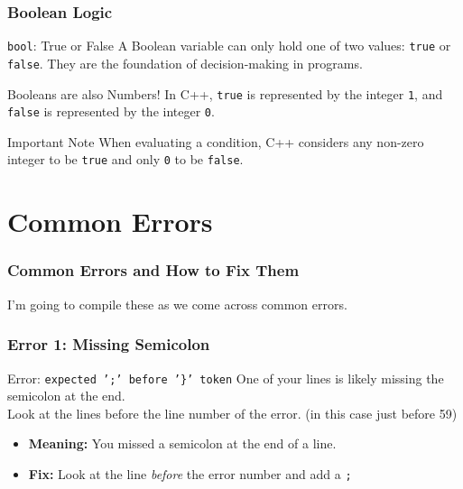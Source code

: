 \documentclass{beamer}
\begin{document}
\begin{frame}
\frametitle{Boolean Logic}
\begin{block}{\texttt{bool}: True or False}
A Boolean variable can only hold one of two values: \texttt{true} or \texttt{false}. They are the foundation of decision-making in programs.
\end{block}\pause

\begin{alertblock}{Booleans are also Numbers!}
In C++, \texttt{true} is represented by the integer \texttt{1}, and \texttt{false} is represented by the integer \texttt{0}.
\end{alertblock}\pause

\begin{exampleblock}{Important Note}
When evaluating a condition, C++ considers any non-zero integer to be \texttt{true} and only \texttt{0} to be \texttt{false}.
\end{exampleblock}
\end{frame}


\section{Common Errors}

\begin{frame}
\frametitle{Common Errors and How to Fix Them}
I'm going to compile these as we come across common errors.
\end{frame}

\begin{frame}
\frametitle{Error 1: Missing Semicolon}
\begin{alertblock}{Error: \texttt{expected ';' before '\}' token}}
One of your lines is likely missing the semicolon at the end.\\
Look at the lines before the line number of the error. (in this case just before 59)
\end{alertblock}
\begin{itemize}
    \item \textbf{Meaning:} You missed a semicolon at the end of a line.
    \item \textbf{Fix:} Look at the line \textit{before} the error number and add a \texttt{;}
\end{itemize}
\end{frame}
\end{document}
